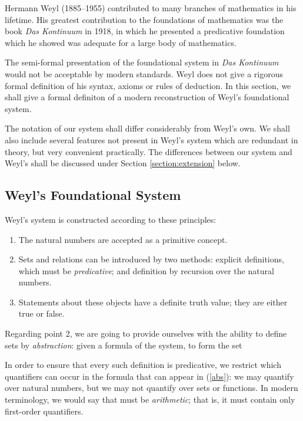 \documentclass[acmtocl]{acmtrans2m}
\begin{document}
Hermann Weyl (1885--1955) contributed to
many branches of mathematics in his lifetime.  His greatest
contribution to the foundations of mathematics was the book
\emph{Das Kontinuum} \cite{weyl:kontinuum} in 1918, in which he
presented a predicative foundation which he showed was
adequate for a large body of mathematics.

The semi-formal presentation of the foundational system in \emph{Das Kontinuum} would not be acceptable by modern standards.  Weyl does not give a rigorous formal definition of his syntax, axioms or rules of deduction.  In this section, we shall give a formal definiton of a modern reconstruction of Weyl's foundational system.

\pagebreak

The notation of our system shall differ considerably from Weyl's own.
We shall also include several features not present in Weyl's system which are redundant in theory, but very convenient practically.
The differences between our system and Weyl's shall be discussed under Section \ref{section:extension}
below.

\subsection{Weyl's Foundational System}

Weyl's system is constructed according to these principles:
\begin{enumerate}
\item
The natural numbers are accepted as a primitive concept.
\item
Sets and relations can be introduced by two methods: explicit
definitions, which must be \emph{predicative}; and definition by
recursion over the natural numbers.
\item
Statements about these objects have a definite truth value; they are either true or false.
\end{enumerate}

Regarding point 2, we are going to provide ourselves with the ability to define sets by \emph{abstraction}: given a formula  of the system, to form the set

In order to ensure that every such definition is predicative, we restrict which quantifiers can occur in the formula  that can appear in (\ref{abs}): we may quantify over natural numbers, but we may not quantify over sets or functions.  In modern terminology, we would say that  must be \emph{arithmetic}; that is, it must contain only first-order quantifiers.
\end{document}
